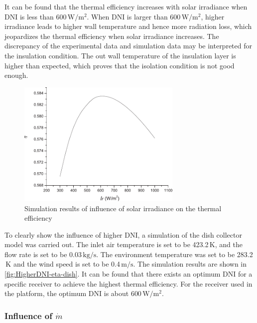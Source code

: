 It can be found that the thermal efficiency increases with solar irradiance when DNI is less than 600$\,\mathrm{W/m^2}$. When DNI is larger than 600$\,\mathrm{W/m^2}$, higher irradiance leads to higher wall temperature and hence more radiation loss, which jeopardizes the thermal efficiency when solar irradiance increases. 
The discrepancy of the experimental data and simulation data may be interpreted for the insulation condition. The out wall temperature of the insulation layer is higher than expected, which proves that the isolation condition is not good enough. 

\begin{figure}[!ht]
\centering
\includegraphics[width=0.7\textwidth]{fig/HigherDNI-eta-dish}
\caption{Simulation results of influence of solar irradiance on the thermal efficiency}
\label{fig:HigherDNI-eta-dish}
\end{figure}
To clearly show the influence of higher DNI, a simulation of the dish collector model was carried out. The inlet air temperature is set to be 423.2$\,\mathrm{K}$, and the flow rate is set to be 0.03$\,\mathrm{kg/s}$. The environment temperature was set to be 283.2$\,\mathrm{K}$ and the wind speed is set to be 0.4$\,\mathrm{m/s}$. The simulation results are shown in \autoref{fig:HigherDNI-eta-dish}. It can be found that there exists an optimum DNI for a specific receiver to achieve the highest thermal efficiency. For the receiver used in the platform, the optimum DNI is about 600$\,\mathrm{W/m^2}$.


\subsubsection{Influence of $\dot{m}$}

